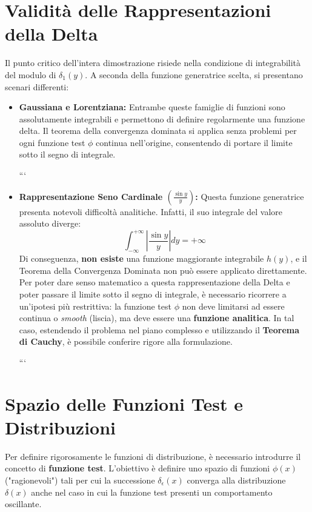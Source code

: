 \section{Validità delle Rappresentazioni della Delta}

Il punto critico dell'intera dimostrazione risiede nella condizione di integrabilità del modulo di $\delta_1(y)$. A seconda della funzione generatrice scelta, si presentano scenari differenti:

\begin{itemize}
\item \textbf{Gaussiana e Lorentziana:} Entrambe queste famiglie di funzioni sono assolutamente integrabili e permettono di definire regolarmente una funzione delta. Il teorema della convergenza dominata si applica senza problemi per ogni funzione test $\phi$ continua nell'origine, consentendo di portare il limite sotto il segno di integrale.

```
\item \textbf{Rappresentazione Seno Cardinale $\left( \frac{\sin y}{y} \right)$:} Questa funzione generatrice presenta notevoli difficoltà analitiche. Infatti, il suo integrale del valore assoluto diverge:
\begin{equation}
    \int_{-\infty}^{+\infty} \left| \frac{\sin y}{y} \right| dy = +\infty
\end{equation}
Di conseguenza, \textbf{non esiste} una funzione maggiorante integrabile $h(y)$, e il Teorema della Convergenza Dominata non può essere applicato direttamente. 
Per poter dare senso matematico a questa rappresentazione della Delta e poter passare il limite sotto il segno di integrale, è necessario ricorrere a un'ipotesi più restrittiva: la funzione test $\phi$ non deve limitarsi ad essere continua o \textit{smooth} (liscia), ma deve essere una \textbf{funzione analitica}. In tal caso, estendendo il problema nel piano complesso e utilizzando il \textbf{Teorema di Cauchy}, è possibile conferire rigore alla formulazione.

```

\end{itemize}

\section{Spazio delle Funzioni Test e Distribuzioni}

Per definire rigorosamente le funzioni di distribuzione, è necessario introdurre il concetto di \textbf{funzione test}. L'obiettivo è definire uno spazio di funzioni $\phi(x)$ ("ragionevoli") tali per cui la successione $\delta_\epsilon(x)$ converga alla distribuzione $\delta(x)$ anche nel caso in cui la funzione test presenti un comportamento oscillante.

